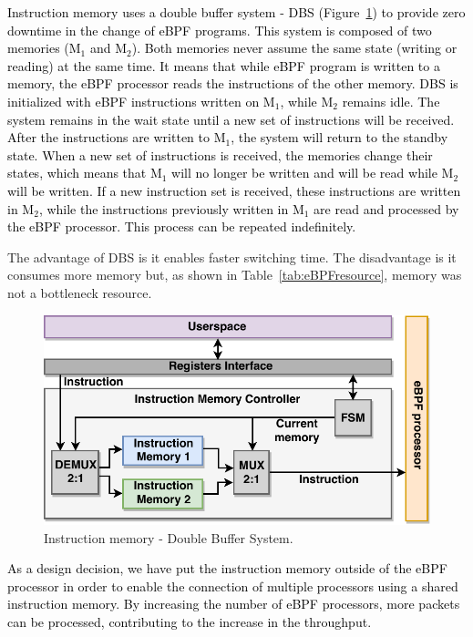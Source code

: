 \textcolor{black}{Instruction memory uses a double buffer system - DBS (Figure~\ref{fig:mem_db}) to provide zero downtime in the change of eBPF programs. This system is composed of two memories (M$_{1}$ and M$_{2}$). Both memories never assume the same state (writing or reading) at the same time. It means that while eBPF program is written to a memory, the eBPF processor reads the instructions of the other memory. DBS is initialized with eBPF instructions written on M$_{1}$, while M$_{2}$ remains idle. The system remains in the wait state until a new set of instructions will be received. After the instructions are written to M$_{1}$, the system will return to the standby state. When a new set of instructions is received, the memories change their states, which means that M$_{1}$ will no longer be written and will be read while M$_{2}$ will be written. If a new instruction set is received, these instructions are written in M$_{2}$, while the instructions previously written in M$_{1}$ are read and processed by the eBPF processor. This process can be repeated indefinitely.} 

The advantage of DBS is it enables faster switching time. The disadvantage is it consumes more memory but, as shown in Table~\ref{tab:eBPFresource}, memory was not a bottleneck resource.

\begin{figure}[tb]
\centering
\includegraphics[width=\linewidth]{figures/memory_db.pdf}
\caption{Instruction memory - Double Buffer System.}
\label{fig:mem_db}
\end{figure}

\textcolor{black}{As a design decision, we have put the instruction memory outside of the eBPF processor in order to enable the connection of multiple processors using a shared instruction memory. By increasing the number of eBPF processors, more packets can be processed, contributing to the increase in the throughput.}


